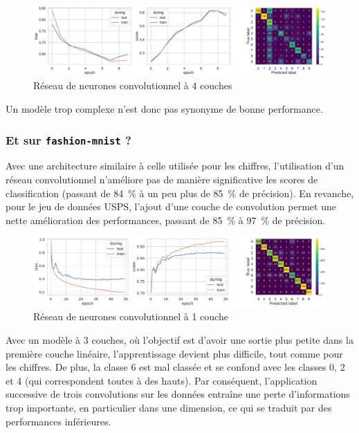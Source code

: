 \documentclass{article}
\begin{document}
\begin{figure}[htbp]
    \centering
    \includegraphics[width=\textwidth]{conv/conv_4layers.pdf}
    \caption{Réseau de neurones convolutionnel à 4 couches}
    \label{fig:conv4layers}
\end{figure}

Un modèle trop complexe n'est donc pas synonyme de bonne performance.

\subsubsection{Et sur \texttt{fashion-mnist} ?}

Avec une architecture similaire à celle utilisée pour les chiffres, l'utilisation d'un réseau convolutionnel n'améliore pas de manière significative les scores de classification (passant de 84~\% à un peu plus de 85~\% de précision). En revanche, pour le jeu de données USPS, l'ajout d'une couche de convolution permet une nette amélioration des performances, passant de 85~\% à 97~\% de précision.

\begin{figure}[htbp]
    \centering
    \includegraphics[width=\textwidth]{conv/fashion_conv_1layer_2linear.pdf}
    \caption{Réseau de neurones convolutionnel à 1 couche}
    \label{fig:conv2layers_fashion}
\end{figure}

Avec un modèle à 3 couches, où l'objectif est d'avoir une sortie plus petite dans la première couche linéaire, l'apprentissage devient plus difficile, tout comme pour les chiffres. De plus, la classe 6 est mal classée et se confond avec les classes 0, 2 et 4 (qui correspondent toutes à des hauts). Par conséquent, l'application successive de trois convolutions sur les données entraîne une perte d'informations trop importante, en particulier dans une dimension, ce qui se traduit par des performances inférieures.
\end{document}
